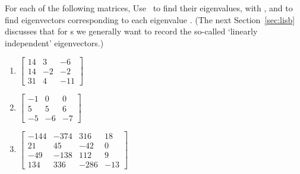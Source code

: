 \begin{exercise} \label{ex:} 
For each of the following matrices, Use \script\ to find their eigenvalues, with , and to find eigenvectors corresponding to each eigenvalue \twodp.  
(The next Section~\ref{sec:lisb} discusses that for s we generally want to record the so-called `linearly independent' eigenvectors.)
\begin{enumerate}
\item \(\begin{bmatrix} 14 & 3 & -6
\\14 & -2 & -2
\\31 & 4 & -11 \end{bmatrix}\)
\setbox\ajrqrbox\hbox{}\marginpar{\usebox{\ajrqrbox}}%

\item \(\begin{bmatrix} -1 & 0 & 0
\\5 & 5 & 6
\\-5 & -6 & -7 \end{bmatrix}\)
\setbox\ajrqrbox\hbox{}\marginpar{\usebox{\ajrqrbox}}%

\item \(\begin{bmatrix} -144 & -374 & 316 & 18
\\21 & 45 & -42 & 0
\\-49 & -138 & 112 & 9
\\134 & 336 & -286 & -13 \end{bmatrix}\)
\setbox\ajrqrbox\hbox{}\marginpar{\usebox{\ajrqrbox}}%


\end{enumerate}
\end{exercise}
